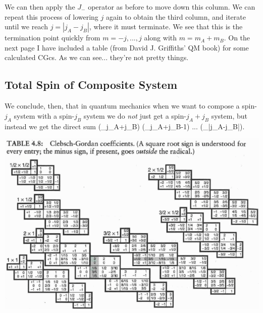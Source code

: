 We can then apply the $J_-$ operator as before to move down this column. We can repeat this process of lowering $j$ again to obtain the third column, and iterate until we reach $j=|j_A-j_B|$, where it must terminate. We see that this is the termination point quickly from $m=-j,...,j$ along with $m=m_A+m_B$. On the next page I have included a table (from David J. Griffiths' QM book) for some calculated CGcs. As we can see... they're not pretty things.

\subsection{Total Spin of Composite System}

We conclude, then, that in quantum mechanics when we want to compose a spin-$j_A$ system with a spin-$j_B$ system we do \emph{not} just get a spin-$j_A+j_B$ system, but instead we get the direct sum 
\bse
(_{j_A+j_B}) \oplus (_{j_A+j_B-1}) \oplus ... \oplus (_{|j_A-j_B|}).
\ese 

\begin{center}
\includegraphics[scale=0.7,angle=90, origin=c]{graphics/ClebschGordan.png}
\end{center}